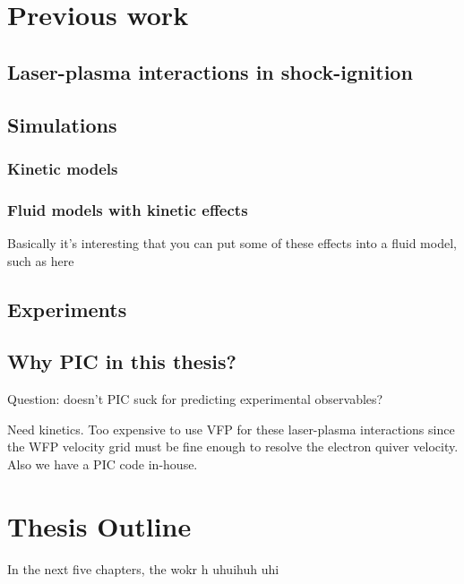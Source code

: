 \section{Previous work}
\subsection{Laser-plasma interactions in shock-ignition}
\subsection{Simulations}
\subsubsection{Kinetic models}
\subsubsection{Fluid models with kinetic effects}
Basically it's interesting that you can put some of these effects into a fluid model, such as here \citep{Tran2020}
\subsection{Experiments}

\subsection{Why PIC in this thesis?}
Question: doesn't PIC suck for predicting experimental observables? 

Need kinetics. Too expensive to use VFP for these laser-plasma interactions since the WFP velocity grid must be fine enough to resolve the electron quiver velocity. Also we have a PIC code in-house.

\section{Thesis Outline}
In the next five chapters, the wokr h uhuihuh uhi 

